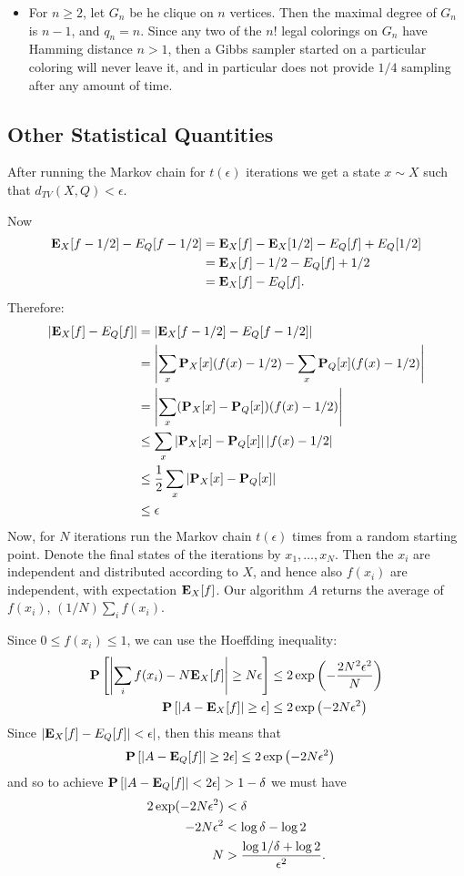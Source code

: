 \documentclass[11pt]{article} \usepackage{amssymb}
\newcommand{\E}{{\bf E}} \newcommand{\Cov}{{\bf Cov}}
\begin{document}
\begin{itemize}
\item
For $n \geq 2$, let $G_n$ be he clique on $n$ vertices. Then the maximal degree
of $G_n$ is $n-1$, and $q_n=n$. Since any two of the $n!$ legal colorings on 
$G_n$ have
Hamming distance $n>1$, then a Gibbs sampler started on a particular coloring
will never leave it, and in particular does not provide $1/4$ sampling after
any amount of time.


\end{itemize}
\subsection{Other Statistical Quantities}
After running the Markov chain for $t(\epsilon)$ iterations we get a state
$x \sim X$ such that $d_{TV}(X,Q)<\epsilon$. 

Now
\begin{align*}
  \E_X[f-1/2]-E_Q[f-1/2] &=\E_X[f]-\E_X[1/2]-E_Q[f]+E_Q[1/2]
  \\ &= \E_X[f]-1/2-E_Q[f]+1/2
  \\ &= \E_X[f]-E_Q[f].
\end{align*}
Therefore:
\begin{align*}
  |\E_X[f]-E_Q[f]| &= |\E_X[f-1/2]-E_Q[f-1/2]|
  \\ &= \left|\sum_x\P_X[x](f(x)-1/2)-\sum_x\P_Q[x](f(x)-1/2)\right|
  \\ &= \left|\sum_x(\P_X[x]-\P_Q[x])(f(x)-1/2)\right|
  \\ &\leq \sum_x\left|\P_X[x]-\P_Q[x]\right| |f(x)-1/2|
  \\ &\leq {1\over 2}\sum_x\left|\P_X[x]-\P_Q[x]\right|
  \\ &\leq \epsilon
\end{align*}
Now, for $N$ iterations run the Markov chain $t(\epsilon)$ times from a random
starting point. Denote the final states of the iterations by
$x_1,\ldots,x_N$. Then the $x_i$ are independent and distributed according
to $X$, and hence also $f(x_i)$ are independent, with expectation $\E_X[f]$. Our
algorithm $A$ returns the average of $f(x_i)$, $(1/N)\sum_i f(x_i)$.

Since $0 \leq f(x_i) \leq 1$, we can use the Hoeffding inequality:
\begin{align*}
  \P\left[\left|\sum_if(x_i)-N\E_X[f]\right|\geq N\epsilon\right] &\leq 
    2\exp\left(-{2N^2\epsilon^2\over N}\right)
\\   \P\left[\left|A-\E_X[f]\right|\geq \epsilon\right] &\leq 
    2\exp\left(-2N\epsilon^2\right)
\end{align*}
Since $|\E_X[f]-E_Q[f]|<\epsilon|$, then this means that
\begin{align*}
   \P\left[\left|A-\E_Q[f]\right|\geq 2\epsilon\right] &\leq 
    2\exp\left(-2N\epsilon^2\right)
\end{align*}
and so to achieve $\P\left[\left|A-\E_Q[f]\right| < 2\epsilon\right]>1-\delta$
we must have
\begin{align*}
  2\exp(-2N\epsilon^2)&<\delta
  \\ -2N\epsilon^2&<\log\delta-\log 2
  \\ N &> {\log 1/\delta+\log 2\over \epsilon^2}.
\end{align*}
\end{document}
